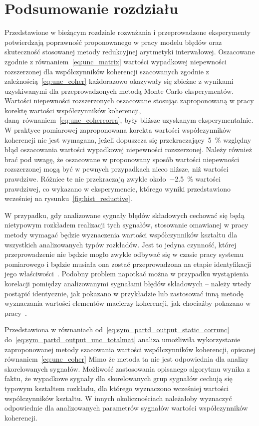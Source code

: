 \section{Podsumowanie rozdziału}

Przedstawione w bieżącym rozdziale rozważania i przeprowadzone eksperymenty potwierdzają poprawność proponowanego w pracy modelu błędów oraz skuteczność stosowanej metody redukcyjnej arytmetyki interwałowej. Oszacowane zgodnie z równaniem~\eqref{eq:unc_matrix} wartości wypadkowej niepewności rozszerzonej dla współczynników koherencji szacowanych zgodnie z zależnością~\eqref{eq:unc_coher} każdorazowo okazywały się zbieżne z wynikami uzyskiwanymi dla przeprowadzonych metodą Monte Carlo eksperymentów. Wartości niepewności rozszerzonych oszacowane stosując zaproponowaną w pracy korektę wartości współczynników koherencji, daną równaniem~\eqref{eq:unc_cohercorra}, były bliższe uzyskanym eksperymentalnie. W praktyce pomiarowej zaproponowana korekta wartości współczynników koherencji nie jest wymagana, jeżeli dopuszcza się przekraczający~\qty{5}{\percent} względny błąd oszacowania wartości wypadkowej niepewności rozszerzonej. Należy również brać pod uwagę, że oszacowane w proponowany sposób wartości niepewności rozszerzonej mogą być w pewnych przypadkach nieco niższe, niż wartości prawdziwe. Różnice te nie przekraczają zwykle około~\qty{-2.5}{\percent} wartości prawdziwej, co wykazano w eksperymencie, którego wyniki przedstawiono wcześniej na rysunku~\ref{fig:hist_reductive}.

W przypadku, gdy analizowane sygnały błędów składowych cechować się będą nietypowym rozkładem realizacji tych sygnałów, stosowanie omawianej w pracy metody wymagać będzie wyznaczenia wartości współczynników kształtu dla wszystkich analizowanych typów rozkładów. Jest to jedyna czynność, której przeprowadzenie nie będzie mogło zwykle odbywać się w czasie pracy systemu pomiarowego i będzie musiała ona zostać przeprowadzona na etapie identyfikacji jego właściwości~\cite{auth_reductive}. Podobny problem napotkać można w przypadku wystąpienia korelacji pomiędzy analizowanymi sygnałami błędów składowych -- należy wtedy postąpić identycznie, jak pokazano w przykładzie lub zastosować inną metodę wyznaczania wartości elementów macierzy koherencji, jak chociażby pokazano w pracy~\cite{jakubiec_reductive}.

Przedstawiona w równaniach od~\eqref{eq:sym_partd_output_static_corrunc} do~\eqref{eq:sym_partd_output_unc_totalmat} analiza umożliwiła wykorzystanie zaproponowanej metody szacowania wartości współczynników koherencji, opisanej równaniem~\eqref{eq:unc_coher} Mimo że metoda ta nie jest odpowiednia dla analizy skorelowanych sygnałów. Możliwość zastosowania opisanego algorytmu wynika z faktu, że wypadkowe sygnały dla skorelowanych grup sygnałów cechują się typowym kształtem rozkładu, dla którego wyznaczono wcześniej wartości współczynników kształtu. W innych okolicznościach należałoby wyznaczyć odpowiednie dla analizowanych parametrów sygnałów wartości współczynników koherencji.

